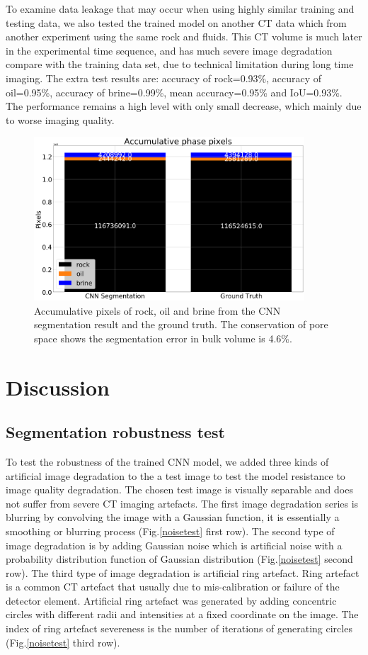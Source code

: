 \documentclass[draft,linenumbers]{agujournal2018}
\begin{document}
To examine data leakage that may occur when using highly similar training and testing data, we also tested the trained model on another CT data which from another experiment using the same rock and fluids. This CT volume is much later in the experimental time sequence, and has much severe image degradation compare with the training data set, due to technical limitation during long time imaging. The extra test results are: accuracy of rock=0.93\%,
accuracy of oil=0.95\%, accuracy of brine=0.99\%, mean accuracy=0.95\% and IoU=0.93\%. The performance remains a high level with only small decrease, which mainly due to worse imaging quality.

\begin{figure}[h]
 \centering
 \includegraphics[width=0.9\textwidth]{imgs/accumulative.png}
 \caption{Accumulative pixels of rock, oil and brine from the CNN segmentation result and the ground truth. The conservation of pore space shows the segmentation error in bulk volume is 4.6\%.}
 \label{accumulative}
 \end{figure}

\section{Discussion}
\subsection{Segmentation robustness test}
To test the robustness of the trained CNN model, we added three kinds of artificial image degradation to the a test image to test the model resistance to image quality degradation. The chosen test image is visually separable and does not suffer from severe CT imaging artefacts. The first image degradation series is blurring by convolving the image with a Gaussian function, it is essentially a smoothing or blurring process (Fig.\ref{noisetest} first row). The second type of image degradation is by adding Gaussian noise which is artificial noise with a probability distribution function of Gaussian distribution (Fig.\ref{noisetest} second row). The third type of image degradation is artificial ring artefact. Ring artefact is a common CT artefact that usually due to mis-calibration or failure of the detector element. Artificial ring artefact was generated by adding concentric circles with different radii and intensities at a fixed coordinate on the image. The index of ring artefact severeness is the number of iterations of generating circles (Fig.\ref{noisetest} third row).
\end{document}
